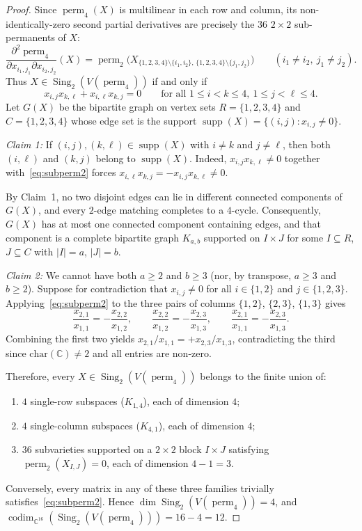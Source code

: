 \documentclass[11pt,a4paper]{article}
\theoremstyle{definition}
\DeclareMathOperator{\perm}{perm}
\DeclareMathOperator{\codim}{codim}
\DeclareMathOperator{\Sing}{Sing}
\DeclareMathOperator{\supp}{supp}
\begin{document}
\begin{proof}
Since $\perm_4(X)$ is multilinear in each row and column, its non-identically-zero second partial derivatives are precisely the $36$ $2 \times 2$ sub-permanents of $X$:
\[
  \frac{\partial^2 \perm_4}{\partial x_{i_1,j_1} \partial x_{i_2,j_2}}(X)
  = \perm_2\big(X_{\{1,2,3,4\}\setminus\{i_1,i_2\},\,\{1,2,3,4\}\setminus\{j_1,j_2\}}\big)
  \qquad (i_1 \neq i_2,\ j_1 \neq j_2).
\]
Thus $X \in \Sing_2(V(\perm_4))$ if and only if
\begin{equation}\label{eq:subperm2}
  x_{i,j} x_{k,\ell} + x_{i,\ell} x_{k,j} = 0 \qquad \text{for all } 1 \le i < k \le 4,\ 1 \le j < \ell \le 4.
\end{equation}
Let $G(X)$ be the bipartite graph on vertex sets $R = \{1,2,3,4\}$ and $C = \{1,2,3,4\}$ whose edge set is the support $\supp(X) = \{(i,j) : x_{i,j} \neq 0\}$.

\emph{Claim 1:} If $(i,j), (k,\ell) \in \supp(X)$ with $i \neq k$ and $j \neq \ell$, then both $(i,\ell)$ and $(k,j)$ belong to $\supp(X)$.  
Indeed, $x_{i,j} x_{k,\ell} \neq 0$ together with~\eqref{eq:subperm2} forces $x_{i,\ell} x_{k,j} = -x_{i,j} x_{k,\ell} \neq 0$.

By Claim~1, no two disjoint edges can lie in different connected components of $G(X)$, and every $2$-edge matching completes to a $4$-cycle. Consequently, $G(X)$ has at most one connected component containing edges, and that component is a complete bipartite graph $K_{a,b}$ supported on $I \times J$ for some $I \subseteq R$, $J \subseteq C$ with $|I| = a$, $|J| = b$.

\emph{Claim 2:} We cannot have both $a \ge 2$ and $b \ge 3$ (nor, by transpose, $a \ge 3$ and $b \ge 2$).  
Suppose for contradiction that $x_{i,j} \neq 0$ for all $i \in \{1,2\}$ and $j \in \{1,2,3\}$. Applying~\eqref{eq:subperm2} to the three pairs of columns $\{1,2\}$, $\{2,3\}$, $\{1,3\}$ gives
\[
  \frac{x_{2,1}}{x_{1,1}} = -\frac{x_{2,2}}{x_{1,2}}, \qquad
  \frac{x_{2,2}}{x_{1,2}} = -\frac{x_{2,3}}{x_{1,3}}, \qquad
  \frac{x_{2,1}}{x_{1,1}} = -\frac{x_{2,3}}{x_{1,3}}.
\]
Combining the first two yields $x_{2,1}/x_{1,1} = +x_{2,3}/x_{1,3}$, contradicting the third since $\mathrm{char}(\mathbb{C}) \neq 2$ and all entries are non-zero.

Therefore, every $X \in \Sing_2(V(\perm_4))$ belongs to the finite union of:
\begin{enumerate}
  \item $4$ single-row subspaces ($K_{1,4}$), each of dimension $4$;
  \item $4$ single-column subspaces ($K_{4,1}$), each of dimension $4$;
  \item $36$ subvarieties supported on a $2 \times 2$ block $I \times J$ satisfying $\perm_2(X_{I,J}) = 0$, each of dimension $4 - 1 = 3$.
\end{enumerate}
Conversely, every matrix in any of these three families trivially satisfies~\eqref{eq:subperm2}. Hence $\dim \Sing_2(V(\perm_4)) = 4$, and $\codim_{\mathbb{C}^{16}}(\Sing_2(V(\perm_4))) = 16 - 4 = 12$.
\end{proof}
\end{document}

